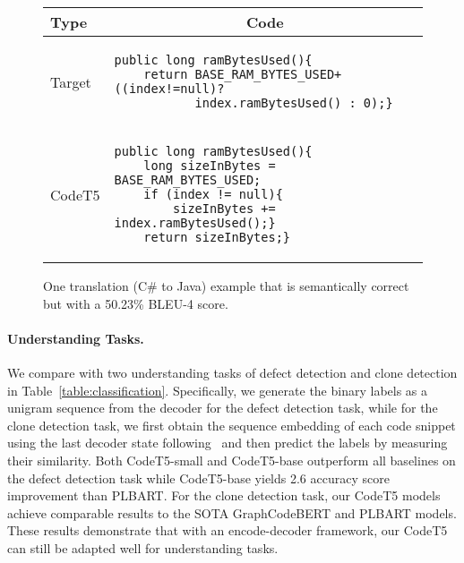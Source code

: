 \documentclass[11pt]{article}
\begin{document}
\begin{figure}[t]
\center
\begin{adjustbox}{width=0.98\linewidth}
\begin{tabular}{lp{8.5cm}}

\toprule
Type & \multicolumn{1}{c}{Code}  \\
\midrule
Target  &
\begin{minipage}{\textwidth}
\begin{verbatim}
public long ramBytesUsed(){
    return BASE_RAM_BYTES_USED+((index!=null)?
           index.ramBytesUsed() : 0);}
  \end{verbatim}
\end{minipage}\\

\midrule
CodeT5  &
\begin{minipage}{\textwidth}
\begin{verbatim}
public long ramBytesUsed(){
    long sizeInBytes = BASE_RAM_BYTES_USED;
    if (index != null){
        sizeInBytes += index.ramBytesUsed();}
    return sizeInBytes;}
  \end{verbatim} 
\end{minipage}\\
\bottomrule
\end{tabular}
\end{adjustbox}
\vspace{-0.5em}
\caption{
\small One  translation  (C\# to Java) example  that is semantically correct but with a 50.23\% BLEU-4 score.
}
\label{fig:translate_case}
\vspace{-1.5em}
\end{figure}
 \paragraph{Understanding Tasks.}
We compare with two understanding tasks of defect detection and clone detection in Table~\ref{table:classification}. 
Specifically, we generate the binary labels as a unigram sequence from the decoder for the defect detection task, while for the clone detection task,  we first obtain the sequence embedding  of each code snippet using the last decoder state following~\citet{DBLP:conf/acl/LewisLGGMLSZ20} and then predict the labels by measuring their similarity.
Both  CodeT5-small and CodeT5-base outperform all baselines on the defect detection task while CodeT5-base yields  2.6 accuracy score improvement than PLBART. 
For the clone detection task, our CodeT5 models achieve comparable results to the SOTA GraphCodeBERT and PLBART models. 
These results demonstrate that with an encode-decoder framework, our CodeT5 can still be adapted well for understanding tasks.
\end{document}

